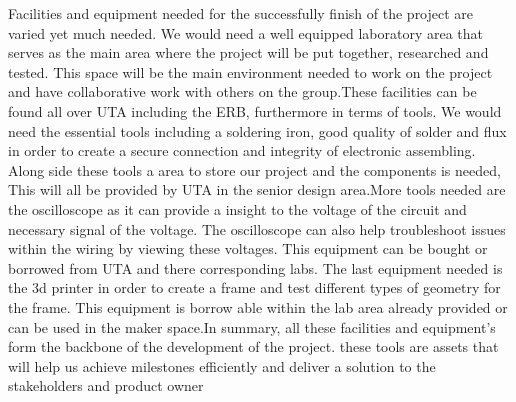 Facilities and equipment needed for the successfully finish of the project are varied yet much needed. We would need a well equipped laboratory area that serves as the main area where the project will be put together, researched and tested. This space will be the main environment needed to work on the project and have collaborative work with others on the group.These facilities can be found all over UTA including the ERB, furthermore in terms of tools. We would need the essential tools including a soldering iron, good quality of solder and flux in order to create a secure connection and integrity of electronic assembling. Along side these tools a area to store our project and the components is needed, This will all be provided by UTA in the senior design area.More tools needed are the oscilloscope as it can provide a insight to the voltage of the circuit and necessary signal of the voltage. The oscilloscope can also help troubleshoot issues within the wiring by viewing these voltages. This equipment can be bought or borrowed from UTA and there corresponding labs. The last equipment needed is the 3d printer in order to create a frame and test different types of geometry for the frame. This equipment is borrow able within the lab area already provided or can be used in the maker space.In summary, all these facilities and equipment's form the backbone of the development of the project. these tools are assets that will help us achieve milestones efficiently and deliver a solution to the stakeholders and product owner
